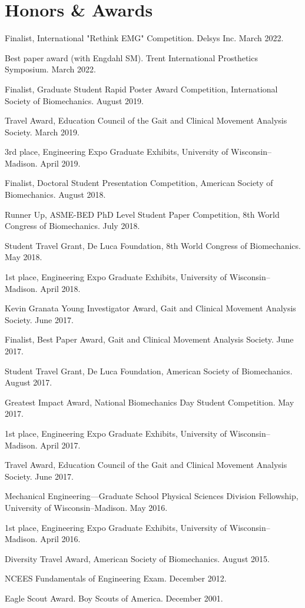 \documentclass[letterpaper, 10pt]{article}
\begin{document}
\section{Honors \& Awards}

\begin{compactitem}
     \item Finalist, International "Rethink EMG" Competition. Delsys Inc. March 2022.
	\item Best paper award (with Engdahl SM). Trent International Prosthetics Symposium. March 2022.
	\item Finalist, Graduate Student Rapid Poster Award Competition, International Society of Biomechanics. August 2019.
	\item Travel Award, Education Council of the Gait and Clinical Movement Analysis Society. March 2019.
	\item 3rd place, Engineering Expo Graduate Exhibits, University of Wisconsin--Madison. April 2019.
	\item Finalist, Doctoral Student Presentation Competition, American Society of Biomechanics. August 2018.
	\item Runner Up, ASME-BED PhD Level Student Paper Competition, 8th World Congress of Biomechanics. July 2018.
	\item Student Travel Grant, De Luca Foundation, 8th World Congress of Biomechanics. May 2018.
	\item 1st place, Engineering Expo Graduate Exhibits, University of Wisconsin--Madison. April 2018.
	\item Kevin Granata Young Investigator Award, Gait and Clinical Movement Analysis Society. June 2017.
	\item Finalist, Best Paper Award, Gait and Clinical Movement Analysis Society. June 2017.
	\item Student Travel Grant, De Luca Foundation, American Society of Biomechanics. August 2017.
	\item Greatest Impact Award, National Biomechanics Day Student Competition. May 2017.
	\item 1st place, Engineering Expo Graduate Exhibits, University of Wisconsin--Madison. April 2017.
	\item Travel Award, Education Council of the Gait and Clinical Movement Analysis Society. June 2017.
	\item Mechanical Engineering---Graduate School Physical Sciences Division Fellowship, University of Wisconsin--Madison. May 2016.
	\item 1st place, Engineering Expo Graduate Exhibits, University of Wisconsin--Madison. April 2016.
	\item Diversity Travel Award, American Society of Biomechanics. August 2015.
	\item NCEES Fundamentals of Engineering Exam. December 2012.
	\item Eagle Scout Award. Boy Scouts of America. December 2001.
\end{compactitem}
\end{document}
